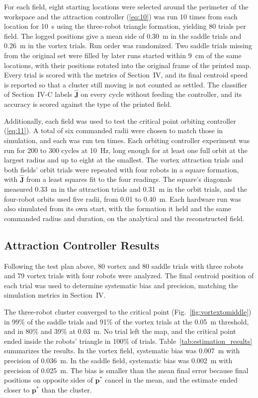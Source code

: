 \documentclass[lettersize,journal]{IEEEtran}
\newcommand{\rev}[1]{#1}
\begin{document}
For each field, eight starting locations were selected around the perimeter of the workspace and the attraction controller (\ref{eq:10}) was run 10 times from each location for \rev{10}~s using the three-robot triangle formation, yielding 80 trials per field. The logged positions give a mean side of \rev{0.30}~m in the saddle trials and \rev{0.26}~m in the vortex trials. Run order was randomized. Two saddle trials missing from the original set were filled by later runs started within \rev{9}~cm of the same locations, with their positions rotated into the original frame of the printed map. Every trial is scored with the metrics of Section~IV, and its final centroid speed is reported so that a cluster still moving is not counted as settled. The classifier of Section~IV-C labels $\hat{\mathbf{J}}$ on every cycle without feeding the controller, and its accuracy is scored against the type of the printed field.

Additionally, each field was used to test the critical point orbiting controller (\ref{eq:11}). A total of \rev{six} commanded radii were chosen to match those in simulation, and each was run \rev{ten} times. Each orbiting controller experiment was run for \rev{200 to 300} cycles at 10~Hz, long enough for at least one full orbit at the largest radius and up to eight at the smallest. The vortex attraction trials and both fields' orbit trials were repeated with four robots in a square formation, with $\hat{\mathbf{J}}$ from a least squares fit to the four readings. The square's diagonals measured \rev{0.33}~m in the attraction trials and \rev{0.31}~m in the orbit trials, and the four-robot orbits used five radii, from 0.01 to 0.40~m. Each hardware run was also simulated from its own start, with the formation it held and the same commanded radius and duration, on the analytical and the reconstructed field.

 \subsection{Attraction Controller Results}

Following the test plan above, \rev{80} vortex and \rev{80} saddle trials with three robots and \rev{79} vortex trials with four robots were analyzed. The final centroid position of each trial was used to determine systematic bias and precision, matching the simulation metrics in Section~IV.

The three-robot cluster converged to the critical point (Fig.~\ref{fig:vortextomiddle}) in \rev{99}\% of the saddle trials and \rev{91}\% of the vortex trials at the 0.05~m threshold, and in \rev{80}\% and \rev{39}\% at 0.03~m. No trial left the map, and the critical point ended inside the robots' triangle in \rev{100}\% of trials. Table~\ref{tab:estimation_results} summarizes the results. In the vortex field, systematic bias was \rev{0.007}~m with precision of \rev{0.036}~m. In the saddle field, systematic bias was \rev{0.002}~m with precision of \rev{0.025}~m. The bias is smaller than the mean final error because final positions on opposite sides of $\mathbf{p}^*$ cancel in the mean, and the estimate ended closer to $\mathbf{p}^*$ than the cluster.
\end{document}
